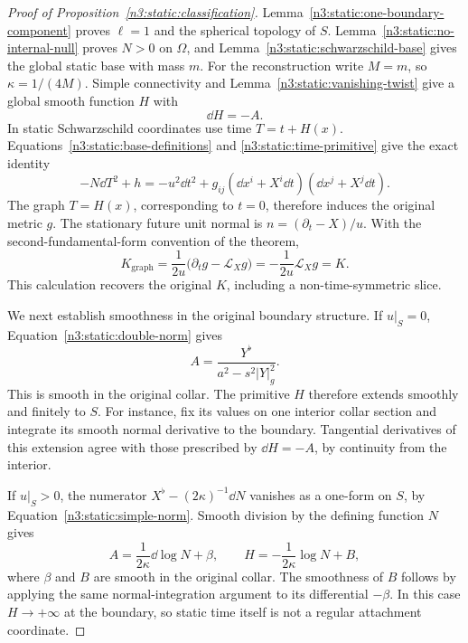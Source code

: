 \begin{proof}[Proof of Proposition~\ref{n3:static:classification}]
Lemma~\ref{n3:static:one-boundary-component} proves $\ell=1$ and the
spherical topology of $S$. Lemma~\ref{n3:static:no-internal-null} proves
\(N>0\) on \(\Omega\), and
Lemma~\ref{n3:static:schwarzschild-base} gives the global static
base with mass \(m\).
For the reconstruction write \(M=m\), so \(\kappa=1/(4M)\).
Simple connectivity and Lemma~\ref{n3:static:vanishing-twist}
give a global smooth function \(H\) with
\begin{equation}
\label{n3:static:time-primitive}
\dd H=-A.
\end{equation}
In static Schwarzschild coordinates use time \(T=t+H(x)\).
Equations~\eqref{n3:static:base-definitions} and
\eqref{n3:static:time-primitive} give the exact identity
\begin{equation}
\label{n3:static:reconstructed-metric}
-N\dd T^2+h
=-u^2\dd t^2+g_{ij}(\dd x^i+X^i\dd t)
                         (\dd x^j+X^j\dd t).
\end{equation}
The graph \(T=H(x)\), corresponding to \(t=0\), therefore induces
the original metric \(g\).
The stationary future unit normal is \(n=(\partial_t-X)/u\).
With the second-fundamental-form convention of the theorem,
\begin{equation}
\label{n3:static:reconstructed-k}
K_{\mathrm{graph}}
=\frac1{2u}\bigl(\partial_tg-\mathcal L_Xg\bigr)
=-\frac1{2u}\mathcal L_Xg
=K.
\end{equation}
This calculation recovers the original \(K\), including a
non-time-symmetric slice.

We next establish smoothness in the original boundary structure.
If \(u|_S=0\), Equation~\eqref{n3:static:double-norm} gives
\[
A=\frac{Y^\flat}{a^2-s^2|Y|_g^2}.
\]
This is smooth in the original collar.
The primitive \(H\) therefore extends smoothly and finitely to \(S\).
For instance, fix its values on one interior collar section and
integrate its smooth normal derivative to the boundary.
Tangential derivatives of this extension agree with those prescribed
by \(\dd H=-A\), by continuity from the interior.

If \(u|_S>0\), the numerator
\(X^\flat-(2\kappa)^{-1}\dd N\) vanishes as a one-form on \(S\),
by Equation~\eqref{n3:static:simple-norm}.
Smooth division by the defining function \(N\) gives
\begin{equation}
\label{n3:static:log-time}
A=\frac1{2\kappa}\dd\log N+\beta,\qquad
H=-\frac1{2\kappa}\log N+B,
\end{equation}
where \(\beta\) and \(B\) are smooth in the original collar.
The smoothness of \(B\) follows by applying the same normal-integration
argument to its differential \(-\beta\).
In this case \(H\to+\infty\) at the boundary, so static time itself
is not a regular attachment coordinate.


\end{proof}

